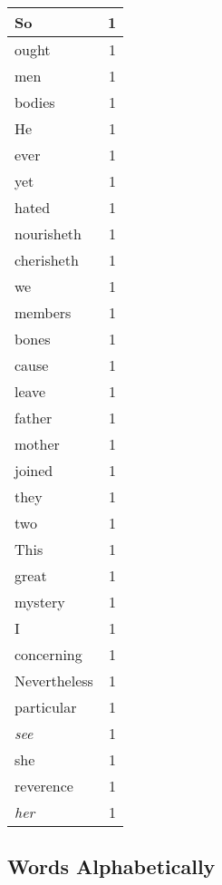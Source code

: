 \begin{center}
\begin{longtable}{l|r}
So & 1\\ \hline 
ought & 1\\ \hline 
men & 1\\ \hline 
bodies & 1\\ \hline 
He & 1\\ \hline 
ever & 1\\ \hline 
yet & 1\\ \hline 
hated & 1\\ \hline 
nourisheth & 1\\ \hline 
cherisheth & 1\\ \hline 
we & 1\\ \hline 
members & 1\\ \hline 
bones & 1\\ \hline 
cause & 1\\ \hline 
leave & 1\\ \hline 
father & 1\\ \hline 
mother & 1\\ \hline 
joined & 1\\ \hline 
they & 1\\ \hline 
two & 1\\ \hline 
This & 1\\ \hline 
great & 1\\ \hline 
mystery & 1\\ \hline 
I & 1\\ \hline 
concerning & 1\\ \hline 
Nevertheless & 1\\ \hline 
particular & 1\\ \hline 
\emph{see} & 1\\ \hline 
she & 1\\ \hline 
reverence & 1\\ \hline 
\emph{her} & 1\\ \hline 
\end{longtable}  
\end{center}  


  
\normalsize  

  
  


\subsection{Words Alphabetically}

